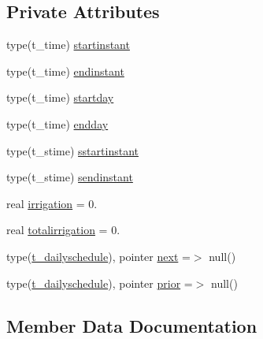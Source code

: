 \subsection*{Private Attributes}
\begin{DoxyCompactItemize}
\item 
type(t\+\_\+time) \mbox{\hyperlink{structmoduleirrigation_1_1t__dailyschedule_a357f66d9bfe47a10033f78752d6692e1}{startinstant}}
\item 
type(t\+\_\+time) \mbox{\hyperlink{structmoduleirrigation_1_1t__dailyschedule_a109ef34fbc8da238f51eb26c05f4b790}{endinstant}}
\item 
type(t\+\_\+time) \mbox{\hyperlink{structmoduleirrigation_1_1t__dailyschedule_ab4f6f7421d16258e13efaae4df61113d}{startday}}
\item 
type(t\+\_\+time) \mbox{\hyperlink{structmoduleirrigation_1_1t__dailyschedule_afe9048f9e4e818904061bd07492e48f4}{endday}}
\item 
type(t\+\_\+stime) \mbox{\hyperlink{structmoduleirrigation_1_1t__dailyschedule_a92b36ddf02ca8e5a776ffd8707ca9616}{sstartinstant}}
\item 
type(t\+\_\+stime) \mbox{\hyperlink{structmoduleirrigation_1_1t__dailyschedule_a575226a432d41fdb6dc461bc8f9d9b64}{sendinstant}}
\item 
real \mbox{\hyperlink{structmoduleirrigation_1_1t__dailyschedule_ab39ff9f3a9940d02bfcfe9c6ae055844}{irrigation}} = 0.
\item 
real \mbox{\hyperlink{structmoduleirrigation_1_1t__dailyschedule_a9b917db3b0daff094b3b54577571e28f}{totalirrigation}} = 0.
\item 
type(\mbox{\hyperlink{structmoduleirrigation_1_1t__dailyschedule}{t\+\_\+dailyschedule}}), pointer \mbox{\hyperlink{structmoduleirrigation_1_1t__dailyschedule_a3f3bc4e2dc1c2c4a74c7290824d3971a}{next}} =$>$ null()
\item 
type(\mbox{\hyperlink{structmoduleirrigation_1_1t__dailyschedule}{t\+\_\+dailyschedule}}), pointer \mbox{\hyperlink{structmoduleirrigation_1_1t__dailyschedule_ac1c958cf14782ee64099a9890070a734}{prior}} =$>$ null()
\end{DoxyCompactItemize}


\subsection{Member Data Documentation}
\mbox{\label{structmoduleirrigation_1_1t__dailyschedule_afe9048f9e4e818904061bd07492e48f4}} 
